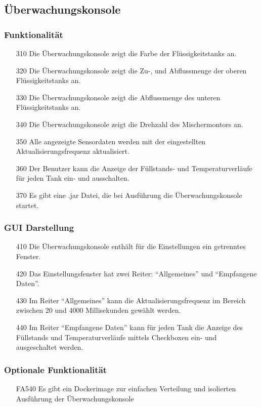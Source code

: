 \documentclass[parskip=full]{scrartcl}
\begin{document}
\subsection{Überwachungskonsole}
\subsubsection{Funktionalität}
\begin{enumerate}
\item[310] Die Überwachungskonsole zeigt die Farbe der Flüssigkeitstanks an.
\item[320] Die Überwachungskonsole zeigt die Zu-, und Abflussmenge der oberen Flüssigkeitstanks an.
\item[330] Die Überwachungskonsole zeigt die Abflussmenge des unteren Flüssigkeitstanks an.
\item[340] Die Überwachungskonsole zeigt die Drehzahl des Mischermontors an.
\item[350] Alle angezeigte Sensordaten werden mit der eingestellten Aktualisierungsfrequenz aktualisiert.
\item[360] Der Benutzer kann die Anzeige der Füllstands- und Temperaturverläufe für jeden Tank ein- und ausschalten.
\item[370] Es gibt eine .jar Datei, die bei Ausführung die Überwachungskonsole startet.
\end{enumerate}
\subsubsection{GUI Darstellung}
\begin{enumerate}
\item[410] Die Überwachungskonsole enthält für die Einstellungen ein getrenntes Fenster.
\item[420] Das Einstellungsfenster hat zwei Reiter: ``Allgemeines'' und ``Empfangene Daten''.
\item[430] Im Reiter ``Allgemeines'' kann die Aktualisierungsfrequenz im Bereich zwischen 20 und 4000 Millisekunden gewählt werden.
\item[440] Im Reiter ``Empfangene Daten'' kann für jeden Tank die Anzeige des Füllstands und Temperaturverläufe mittels Checkboxen ein- und ausgeschaltet werden.
\end{enumerate}

\subsubsection{Optionale Funktionalität}
\label{konsole-optional}
\begin{enumerate}
\item[FA540] Es gibt ein Dockerimage zur einfachen Verteilung und isolierten Ausführung der Überwachungskonsole
\end{enumerate}
\end{document}
